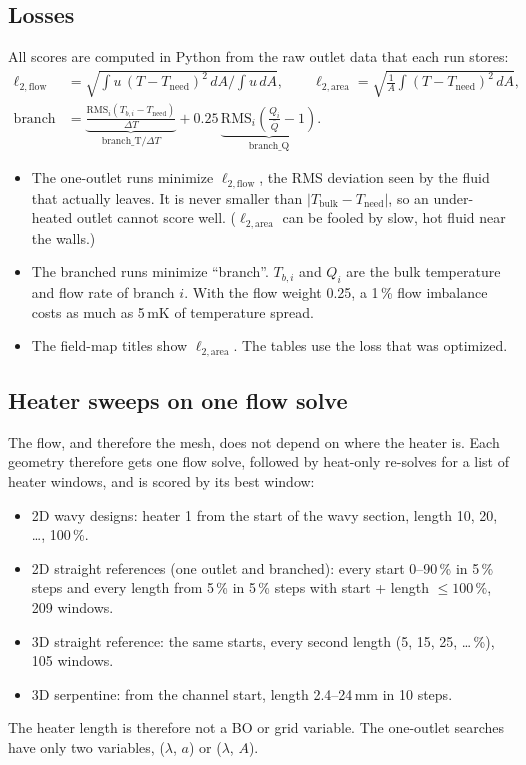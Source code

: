 \documentclass[11pt,a4paper]{article}
\newcommand{\Tneed}{T_\mathrm{need}}
\newcommand{\mK}{\ensuremath{\,\mathrm{mK}}}
\newcommand{\mm}{\ensuremath{\,\mathrm{mm}}}
\newcommand{\ltf}{\ensuremath{\ell_{2,\mathrm{flow}}}}
\begin{document}
\subsection{Losses}
All scores are computed in Python from the raw outlet data that each run stores:
\begin{align*}
  \ltf &= \sqrt{\int u\,(T-\Tneed)^2\,dA \Big/ \int u\,dA}, \qquad
  \ell_{2,\mathrm{area}} = \sqrt{\tfrac{1}{A}\int (T-\Tneed)^2\,dA},\\
  \text{branch} &= \underbrace{\frac{\mathrm{RMS}_i(T_{b,i}-\Tneed)}{\Delta T}}_{\text{branch\_T}/\Delta T}
                 + 0.25\,\underbrace{\mathrm{RMS}_i\!\left(\frac{Q_i}{\bar Q}-1\right)}_{\text{branch\_Q}} .
\end{align*}
\begin{itemize}
  \item The one-outlet runs minimize $\ltf$, the RMS deviation seen by the fluid that actually
        leaves. It is never smaller than $|T_\mathrm{bulk} - \Tneed|$, so an under-heated outlet
        cannot score well. ($\ell_{2,\mathrm{area}}$ can be fooled by slow, hot fluid near the walls.)
  \item The branched runs minimize ``branch''. $T_{b,i}$ and $Q_i$ are the bulk temperature and
        flow rate of branch $i$. With the flow weight 0.25, a 1\,\% flow imbalance costs as much as
        5\mK{} of temperature spread.
  \item The field-map titles show $\ell_{2,\mathrm{area}}$. The tables use the loss that was optimized.
\end{itemize}

\subsection{Heater sweeps on one flow solve}
The flow, and therefore the mesh, does not depend on where the heater is. Each geometry
therefore gets one flow solve, followed by heat-only re-solves for a list of heater windows, and
is scored by its best window:
\begin{itemize}
  \item 2D wavy designs: heater 1 from the start of the wavy section, length 10, 20, \dots, 100\,\%.
  \item 2D straight references (one outlet and branched): every start 0--90\,\% in 5\,\% steps
        and every length from 5\,\% in 5\,\% steps with start + length $\le 100\,\%$, 209 windows.
  \item 3D straight reference: the same starts, every second length (5, 15, 25, \dots\,\%), 105 windows.
  \item 3D serpentine: from the channel start, length 2.4--24\mm{} in 10 steps.
\end{itemize}
The heater length is therefore not a BO or grid variable. The one-outlet searches have only two
variables, ($\lambda$, $a$) or ($\lambda$, $A$).
\end{document}
